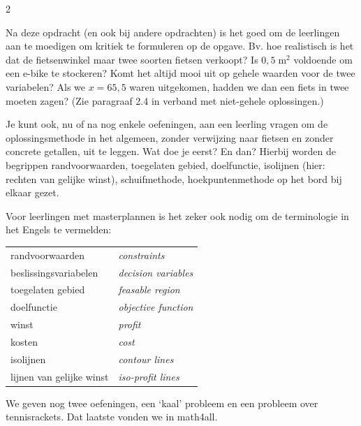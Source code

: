 \begin{multicols}{2}
        
    Na deze opdracht (en ook bij andere opdrachten) is het goed om de leerlingen aan te moedigen om kritiek te formuleren op de opgave. Bv. hoe realistisch is het dat de fietsenwinkel maar twee soorten fietsen verkoopt? Is $0,5\;\mathrm{m}^2$ voldoende om een e-bike te stockeren? Komt het altijd mooi uit op gehele waarden voor de twee variabelen? Als we $x=65,5$ waren uitgekomen, hadden we dan een fiets in twee moeten zagen? (Zie paragraaf 2.4 in verband met niet-gehele oplossingen.)
    
    Je kunt ook, nu of na nog enkele oefeningen, aan een leerling vragen om de oplossingsmethode in het algemeen, zonder verwijzing naar fietsen en zonder concrete getallen, uit te leggen. Wat doe je eerst? En dan? Hierbij worden de begrippen randvoorwaarden, toegelaten gebied, doelfunctie, isolijnen (hier: rechten van gelijke winst), schuifmethode, hoekpuntenmethode op het bord bij elkaar gezet.
    
    Voor leerlingen met masterplannen is het zeker ook nodig om de terminologie in het Engels te vermelden:
    
    \begin{center}
        
    \begin{tabular} {|l|l|}
        \hline
         randvoorwaarden & \emph{constraints}\\
         beslissingsvariabelen & \emph{decision variables}\\
         toegelaten gebied &  \emph{feasable region}\\
         doelfunctie & \emph{objective function}\\
         winst & \emph{profit}\\ 
         kosten & \emph{cost}\\ 
         isolijnen  & \emph{contour lines }\\
         lijnen van gelijke winst & \emph{iso-profit lines}\\
        \hline
    \end{tabular}
    
    \end{center}
    
    We geven nog twee oefeningen, een `kaal' probleem en een probleem over tennisrackets. Dat laatste vonden we in math4all.

\end{multicols}

